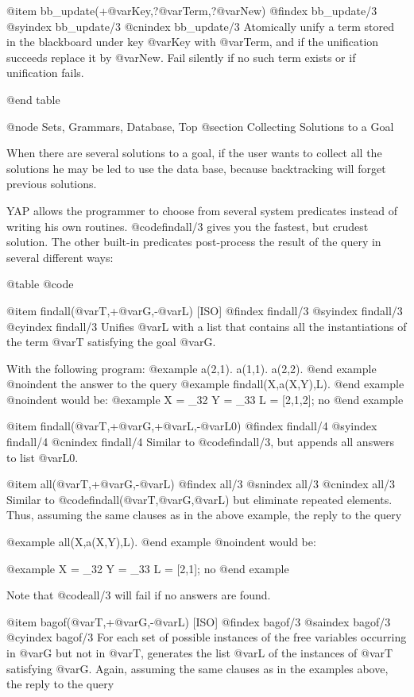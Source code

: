 {{{{{@item bb_update(+@var{Key},?@var{Term},?@var{New})
@findex bb_update/3
@syindex bb_update/3
@cnindex bb_update/3
Atomically  unify a term stored in the blackboard under key @var{Key}
with @var{Term}, and if the unification succeeds replace it by
@var{New}. Fail silently if no such term exists or if unification fails.

@end table

@node Sets, Grammars, Database, Top
@section Collecting Solutions to a Goal

When there are several solutions to a goal, if the user wants to collect all
the solutions he may be led to use the data base, because backtracking will
forget previous solutions.

YAP allows the programmer to choose from several system
predicates instead of writing his own routines.  @code{findall/3} gives you
the fastest, but crudest solution. The other built-in predicates
post-process the result of the query in several different ways:

@table @code

@item findall(@var{T},+@var{G},-@var{L}) [ISO]
@findex findall/3
@syindex findall/3
@cyindex findall/3
Unifies @var{L} with a list that contains all the instantiations of the
term @var{T} satisfying the goal @var{G}.

With the following program:
@example
a(2,1).
a(1,1).
a(2,2).
@end example
@noindent
the answer to the query
@example
findall(X,a(X,Y),L).
@end example
@noindent
would be:
@example
X = _32
Y = _33
L = [2,1,2];
no
@end example

@item findall(@var{T},+@var{G},+@var{L},-@var{L0})
@findex findall/4
@syindex findall/4
@cnindex findall/4
Similar to @code{findall/3}, but appends all answers to list @var{L0}.

@item all(@var{T},+@var{G},-@var{L})
@findex all/3
@snindex all/3
@cnindex all/3
Similar to @code{findall(@var{T},@var{G},@var{L})} but eliminate
repeated elements. Thus, assuming the same clauses as in the above
example, the reply to the query

@example
all(X,a(X,Y),L).
@end example
@noindent
would be:

@example
X = _32
Y = _33
L = [2,1];
no
@end example

Note that @code{all/3} will fail if no answers are found.

@item bagof(@var{T},+@var{G},-@var{L}) [ISO]
@findex bagof/3
@saindex bagof/3
@cyindex bagof/3
For each set of possible instances of the free variables occurring in
@var{G} but not in @var{T}, generates the list @var{L} of the instances of
@var{T} satisfying @var{G}. Again, assuming the same clauses as in the
examples above, the reply to the query

}}}}}
